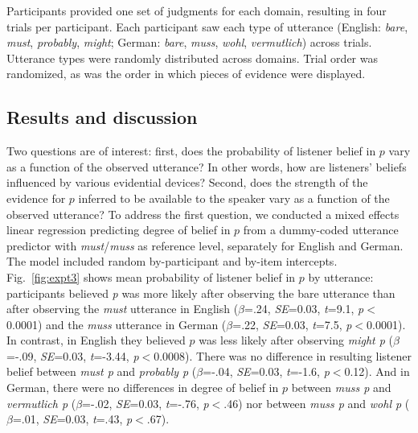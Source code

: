 \documentclass[11pt]{article}
\begin{document}
Participants provided one set of judgments for each domain, resulting in four trials per participant. Each participant saw each type of utterance (English: \emph{bare}, \emph{must}, \emph{probably}, \emph{might}; German: \emph{bare}, \emph{muss}, \emph{wohl}, \emph{vermutlich}) across trials. Utterance types were randomly distributed across domains. Trial order was randomized, as was the order in which pieces of evidence were displayed.


\subsection{Results and discussion}

Two questions are of interest: first, does the probability of listener belief in $p$ vary as a function of the observed utterance? In other words, how are listeners' beliefs influenced by various evidential devices? Second, does the strength of the evidence for $p$ inferred to be available to the speaker vary as a function of the observed utterance? To address the first question, we conducted a mixed effects linear regression predicting degree of belief in $p$ from a dummy-coded utterance predictor with \emph{must}/\emph{muss} as reference level, separately for English and German. The model included random by-participant and by-item intercepts. Fig.~\ref{fig:expt3} shows mean probability of listener belief in $p$ by utterance: participants believed \emph{p} was more likely after observing the bare utterance than after observing the \emph{must} utterance in English  ($\beta$=.24, \emph{SE}=0.03, \emph{t}=9.1, \emph{p}$<$0.0001) and the \emph{muss} utterance in German ($\beta$=.22, \emph{SE}=0.03, \emph{t}=7.5, \emph{p}$<$0.0001). In contrast, in English they believed $p$ was less likely after observing \emph{might p} ($\beta$=-.09, \emph{SE}=0.03, \emph{t}=-3.44, \emph{p}$<$0.0008). There was no difference in resulting listener belief between \emph{must p} and \emph{probably p} ($\beta$=-.04, \emph{SE}=0.03, \emph{t}=-1.6, \emph{p}$<$0.12). And in German, there were no differences in degree of belief in $p$ between \emph{muss p} and \emph{vermutlich p} ($\beta$=-.02, \emph{SE}=0.03, \emph{t}=-.76, \emph{p}$<$.46) nor between \emph{muss p} and \emph{wohl p} ($\beta$=.01, \emph{SE}=0.03, \emph{t}=.43, \emph{p}$<$.67). %
\end{document}
